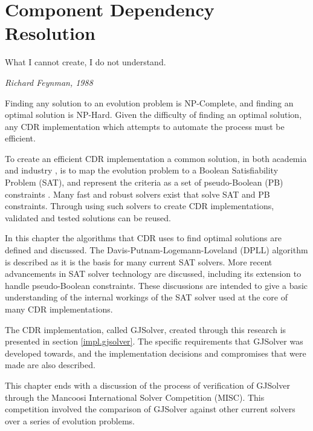 \chapter{Component Dependency Resolution}
\label{implementation}
\epigraph{What I cannot create, I do not understand.}
{\textit{Richard Feynman, 1988}}

Finding any solution to an evolution problem is NP-Complete, and finding an optimal solution is NP-Hard.
Given the difficulty of finding an optimal solution, any CDR implementation which attempts to automate the process must be efficient.

To create an efficient CDR implementation a common solution, in both academia \citep{abate2011} and industry \citep{leBerre2010}, 
is to map the evolution problem to a Boolean Satisfiability Problem (SAT),
and represent the criteria as a set of  pseudo-Boolean (PB) constraints \citep{dixon2004automating}.
Many fast and robust solvers exist that solve SAT and PB constraints.
Through using such solvers to create CDR implementations, validated and tested solutions can be reused.  

In this chapter the algorithms that CDR uses to find optimal solutions are defined and discussed.  
The Davis-Putnam-Logemann-Loveland (DPLL) algorithm \citep{Davis1960, davis1962machine} is described as it is the basis for many current SAT solvers.
More recent advancements in SAT solver technology are discussed, including its extension to handle pseudo-Boolean constraints.
These discussions are intended to give a basic understanding of the internal workings of the SAT solver used at the core of many CDR implementations.

The CDR implementation, called GJSolver, created through this research is presented in section \ref{impl.gjsolver}.
The specific requirements that GJSolver was developed towards, and the implementation decisions and compromises that were made are also described.

This chapter ends with a discussion of the process of verification of GJSolver through the Mancoosi International Solver Competition (MISC).  
This competition involved the comparison of GJSolver against other current solvers over a series of evolution problems.

